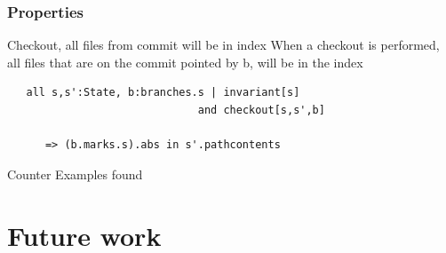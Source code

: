 \documentclass{beamer}
\begin{document}
\begin{frame}[fragile]
	\frametitle{Properties}
	\begin{block}{Checkout, all files from commit will be in index}
      When a checkout is performed, all files that are on the commit
      pointed by b, will be in the index
   \end{block}
	\scriptsize
	\begin{lstlisting}
   all s,s':State, b:branches.s | invariant[s] 
                              and checkout[s,s',b] 
         
      => (b.marks.s).abs in s'.pathcontents
   \end{lstlisting}\pause
   \Large
   \color{red}
   \center
   Counter Examples found
\end{frame}

\section{Future work}


\frame{
   \titlepage
}
\end{document}
